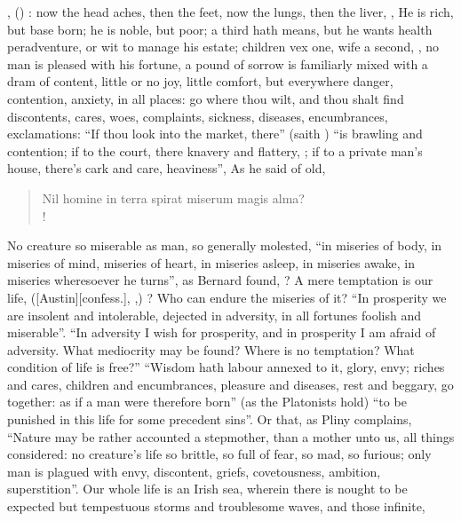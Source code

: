 , (\Seneca{}) : now the head aches,
then the feet, now the lungs, then the liver, \etc{} , \etc{} He is rich, but base born; he is noble,
but poor; a third hath means, but he wants health peradventure, or wit to
manage his estate; children vex one, wife a second, \etc{} , no man is pleased with his fortune, a pound of
sorrow is familiarly mixed with a dram of content, little or no joy, little
comfort, but everywhere danger, contention, anxiety, in
all places: go where thou wilt, and thou shalt find discontents, cares, woes,
complaints, sickness, diseases, encumbrances, exclamations: \enquote{If thou look into
the market, there} (saith \Chrysostom{}) \enquote{is brawling and
contention; if to the court, there knavery and flattery, \etc{}; if to a
private man's house, there's cark and care, heaviness}, \etc{} As he said of
old,

\begin{latin}
\begin{verse}%
Nil homine in terra spirat miserum magis alma?\\!
\end{verse}%
\end{latin}

No creature so miserable as man, so generally molested,
\enquote{in miseries of body, in miseries of mind, miseries of
heart, in miseries asleep, in miseries awake, in miseries wheresoever he
turns}, as Bernard found, ? A
mere temptation is our life, ([Austin][\textlatin{confess.}], ,) ? Who can
endure the miseries of it? \enquote{In prosperity we are insolent
and intolerable, dejected in adversity, in all fortunes foolish and miserable}.
\enquote{In adversity I wish for prosperity, and in prosperity I
am afraid of adversity. What mediocrity may be found? Where is no temptation?
What condition of life is free?} \enquote{Wisdom hath labour
annexed to it, glory, envy; riches and cares, children and encumbrances,
pleasure and diseases, rest and beggary, go together: as if a man were
therefore born} (as the Platonists hold) \enquote{to be punished in this life for some
precedent sins}. Or that, as Pliny complains, \enquote{Nature may
be rather accounted a stepmother, than a mother unto us, all things considered:
no creature's life so brittle, so full of fear, so mad, so furious; only man is
plagued with envy, discontent, griefs, covetousness, ambition, superstition}.
Our whole life is an Irish sea, wherein there is nought to be expected but
tempestuous storms and troublesome waves, and those infinite,

